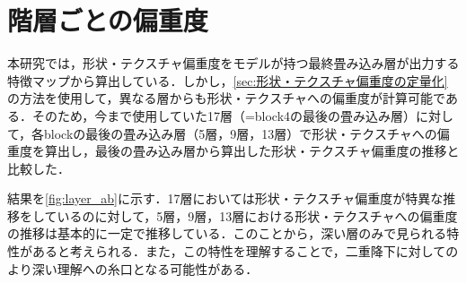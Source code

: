 \section{階層ごとの偏重度}
本研究では，形状・テクスチャ偏重度をモデルが持つ最終畳み込み層が出力する特徴マップから算出している．しかし，\cref{sec:形状・テクスチャ偏重度の定量化}の方法を使用して，異なる層からも形状・テクスチャへの偏重度が計算可能である．そのため，今まで使用していた17層（=block4の最後の畳み込み層）に対して，各blockの最後の畳み込み層（5層，9層，13層）で形状・テクスチャへの偏重度を算出し，最後の畳み込み層から算出した形状・テクスチャ偏重度の推移と比較した．

結果を\cref{fig:layer_ab}に示す．17層においては形状・テクスチャ偏重度が特異な推移をしているのに対して，5層，9層，13層における形状・テクスチャへの偏重度の推移は基本的に一定で推移している．このことから，深い層のみで見られる特性があると考えられる．また，この特性を理解することで，二重降下に対してのより深い理解への糸口となる可能性がある．
